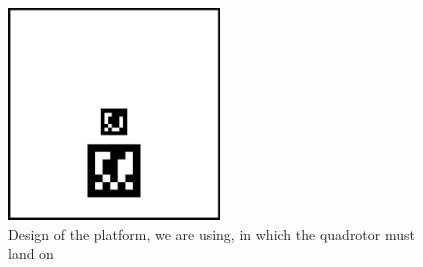 \begin{figure}[!htbp]
    \centering
    \includegraphics[width=0.5\textwidth]{img/tempbase.png}
    \caption{Design of the platform, we are using, in which the quadrotor must land on}
    \label{fig:tempplatform}
\end{figure}

